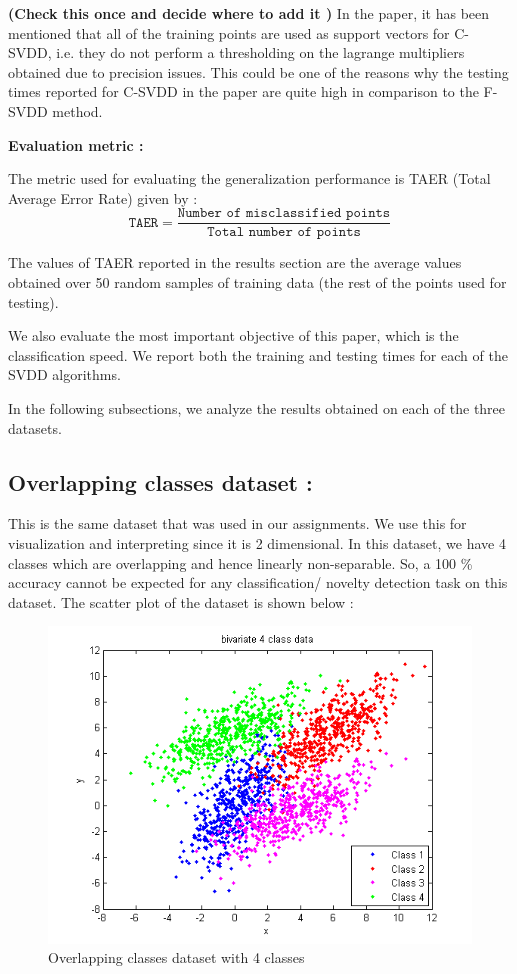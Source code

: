\documentclass{article} %
\begin{document}
\textbf{(Check this once and decide where to add it )}
In the paper, it has been mentioned that all of the training points are used as support vectors for C-SVDD, i.e. they do not perform a thresholding on the lagrange multipliers obtained due to precision issues. This could be one of the reasons why the testing times reported for C-SVDD in the paper are quite high in comparison to the F-SVDD method.



\textbf{Evaluation metric :}

The metric used for evaluating the generalization performance is  TAER (Total Average Error Rate) given by :
\[ \texttt{TAER} = \frac{\texttt{Number of misclassified points}}{\texttt{Total number of points}} \]

The values of TAER reported in the results section are the average values obtained over 50 random samples of training data (the rest of the points used for testing). 

We also evaluate the most important objective of this paper, which is the classification speed. We report both the training and testing times for each of the SVDD algorithms.

In the following subsections, we analyze the results obtained on each of the three datasets. \\[10pt]



\subsection{Overlapping classes dataset :} This is the same dataset that was used in our assignments. We use this for visualization and interpreting since it is 2 dimensional. In this dataset, we have 4 classes which are overlapping and hence linearly non-separable. So, a 100 \% accuracy cannot be expected for any classification/ novelty detection task on this dataset.
The scatter plot of the dataset is shown below :

\begin{figure}
  \centering
  \includegraphics[width=\linewidth]{Plots/overlapping/svdd/data}
  \caption{Overlapping classes dataset with 4 classes}
\end{figure}
\end{document}
